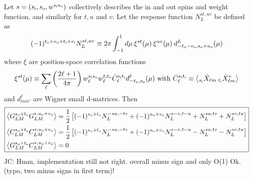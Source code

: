 \documentclass{article}
\newcommand{\si}[0]{{s_{\rm i}}}
\newcommand{\ti}[0]{{t_{\rm i}}}
\newcommand{\vi}[0]{{v_{\rm i}}}
\newcommand{\so}[0]{{s_{\rm o}}}
\renewcommand{\to}[0]{{t_{\rm o}}}
\newcommand{\uo}[0]{{u_{\rm o}}}
\newcommand{\vo}[0]{{v_{\rm o}}}
\newcommand{\av}[1]{\left\langle #1 \right\rangle}
\newcommand{\JC}[1]{\color{red}JC: #1\color{black}}
\begin{document}
Let $s = (\si, \so, w^{\si\so})$ collectively describes the in and out spins and weight function, and similarly for $t, u$ and $v$. Let the response function $N^{st, uv}_L$ be defined as
\begin{equation}
(-1)^{\to + \vo + \ti + \vi} N_L^{st,uv} \equiv 2\pi  \int_{-1}^1 d \mu \:\xi^{st}(\mu)\:\xi^{uv}(\mu)\: d^L_{-\to - \vo, \so + \uo}(\mu) 
\end{equation}
where $\xi$ are position-space correlation functions
\begin{equation}
\xi^{st}(\mu) \equiv  \sum_\ell \left(\frac{2\ell + 1}{4\pi}\right)w^{\si\so}_\ell w^{\ti\to}_\ell \bar C_\ell^{\si \ti} d^\ell_{-\to,\so}(\mu)\textrm{ with } \bar C_\ell^{\si \ti} \equiv \av{ _{\si}\bar X_{\ell m}\: _{\ti} \bar X^*_{\ell m} }
\end{equation}
and $d^\ell_{mm'}$ are Wigner small d-matrices.
Then
\begin{equation} \boxed{
\begin{split}
\av{G^{\so + \to}_{LM} G^{*, \uo + \vo}_{L M} } &= \frac 12\left[ (-1)^{\so + \to} N^{-su, -tv}_L + (-1)^{\uo + \vo} N_L^{s-v, t-u}+N^{su, tv}_L  + N^{sv, tu}_L \right] \\
		\av{C^{\so + \to}_{LM} C^{*, \uo + \vo}_{L M} } &= \frac 12\left[ (-1)^{\so + \to} N^{-su,-tv}_L + (-1)^{\uo + \vo} N_L^{s-v, t-u}-N^{su, tv}_L  - N^{sv, tu}_L \right] \\
	\av{G^{\so + \to}_{LM} C^{*, \uo + \vo}_{L M} } &=0
\end{split}}
\end{equation}
\JC{Hmm, implementation still not right. overall minus sign and only O(1) Ok. (typo, two minus signs in first term)!}
\end{document}
